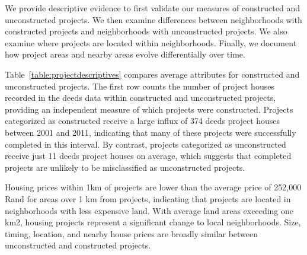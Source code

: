 \documentclass[12pt]{article}
\begin{document}






We provide descriptive evidence to first validate our measures of constructed and unconstructed projects.  We then examine differences between neighborhoods with constructed projects and neighborhoods with unconstructed projects.  We also examine where projects are located within neighborhoods.  Finally, we document how project areas and nearby areas evolve differentially over time.  

Table~\ref{table:projectdescriptives} compares average attributes for constructed and unconstructed projects.  The first row counts the number of project houses recorded in the deeds data within constructed and unconstructed projects, providing an independent measure of which projects were constructed.  Projects categorized as constructed receive a large influx of 374 deeds project houses between 2001 and 2011, indicating that many of these projects were successfully completed in this interval.  By contrast, projects categorized as unconstructed receive just 11 deeds project houses on average, which suggests that completed projects are unlikely to be misclassified as unconstructed projects.   

Housing prices within 1km of projects are lower than the average price of 252,000 Rand for areas over 1 km from projects, indicating that projects are located in neighborhoods with less expensive land.  With average land areas exceeding one km2, housing projects represent a significant change to local neighborhoods.  Size, timing, location, and nearby house prices are broadly similar between unconstructed and constructed projects.  
\end{document}
